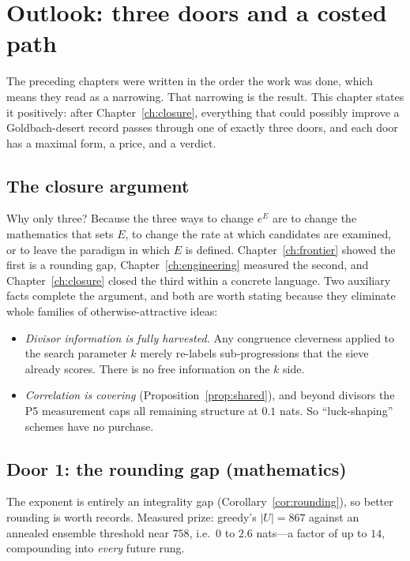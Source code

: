 \chapter{Outlook: three doors and a costed path}\label{ch:outlook}

The preceding chapters were written in the order the work was done, which means
they read as a narrowing. That narrowing is the result. This chapter states it
positively: after Chapter~\ref{ch:closure}, everything that could possibly
improve a Goldbach-desert record passes through one of exactly three doors, and
each door has a maximal form, a price, and a verdict.

\section{The closure argument}

Why only three? Because the three ways to change $e^{E}$ are to change the
mathematics that sets $E$, to change the rate at which candidates are examined,
or to leave the paradigm in which $E$ is defined. Chapter~\ref{ch:frontier}
showed the first is a rounding gap, Chapter~\ref{ch:engineering} measured the
second, and Chapter~\ref{ch:closure} closed the third within a concrete
language. Two auxiliary facts complete the argument, and both are worth stating
because they eliminate whole families of otherwise-attractive ideas:

\begin{itemize}
\item \emph{Divisor information is fully harvested.} Any congruence cleverness
applied to the search parameter $k$ merely re-labels sub-progressions that the
sieve already scores. There is no free information on the $k$ side.
\item \emph{Correlation is covering} (Proposition~\ref{prop:shared}), and
beyond divisors the P5 measurement caps all remaining structure at $0.1$ nats.
So ``luck-shaping'' schemes have no purchase.
\end{itemize}

\section{Door 1: the rounding gap (mathematics)}

The exponent is entirely an integrality gap (Corollary~\ref{cor:rounding}), so
better rounding is worth records. Measured prize: greedy's $|U|=867$ against an
annealed ensemble threshold near $758$, i.e.\ $0$ to $2.6$ nats---a factor of up
to $14$, compounding into \emph{every} future rung.

